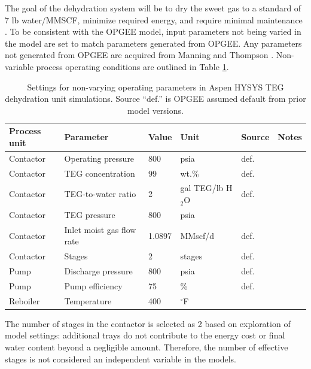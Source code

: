 \documentclass[11pt]{report}
\begin{document}
The goal of the dehydration system will be to dry the sweet gas to a standard of 7 lb water/MMSCF, minimize required energy, and require minimal maintenance \cite{Manning1991}. To be consistent with the OPGEE model, input parameters not being varied in the model are set to match parameters generated from OPGEE. Any parameters not generated from OPGEE are acquired from Manning and Thompson \cite{Manning1991}.  Non-variable process operating conditions are outlined in Table \ref{tab:TEG_Aspen_Settings}.

\begin{table}
\begin{scriptsize}
\caption{Settings for non-varying operating parameters in Aspen HYSYS TEG dehydration unit simulations. Source ``def.'' is OPGEE assumed default from prior model versions.}
\label{tab:TEG_Aspen_Settings}
\begin{tabular*}{1\columnwidth}{p{}p{}p{}p{}p{}p{}}
\toprule
Process unit & Parameter & Value & Unit & Source & Notes \\
\midrule
Contactor &	Operating pressure 		&	800 		& 	psia					& def.	 			&\\
Contactor &	TEG concentration 		&	99	 	&	wt.\% 				& def.	 			& \\
Contactor &	TEG-to-water ratio 		&	2 		&	gal TEG/lb H$_2$O 		& def. 				&  \\
Contactor &	TEG pressure 			&	800 		&	psia 					& \cite{Manning1991} 	&\\
Contactor &	Inlet moist gas flow rate 	&	1.0897	&	MMscf/d 				& def.				& \\
Contactor &	Stages 				&	2		&	stages 				& def.				& \\
\midrule
Pump 	&	Discharge pressure		&	800 		&	psia 					& def.		&\\
Pump 	&	Pump efficiency 		&	75 		&	\%					& def.	& \\
\midrule
Reboiler 	&	Temperature 			&	400 		&	$^\circ$F 				&	\cite{Manning1991}	& \\
\bottomrule
\end{tabular*}
\end{scriptsize}
\end{table}

The number of stages in the contactor is selected as 2 based on exploration of model settings: additional trays do not contribute to the energy cost or final water content beyond a negligible amount. Therefore, the number of effective stages is not considered an independent variable in the models. 
\end{document}
